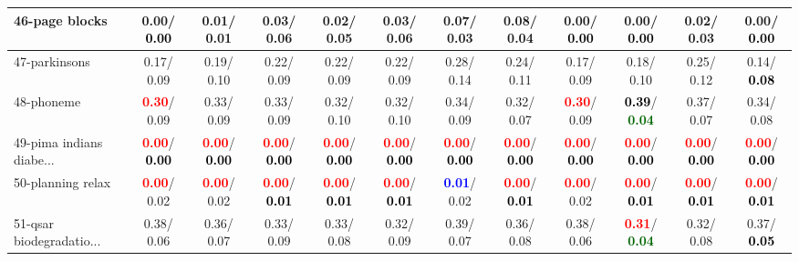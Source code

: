 \begin{table}[h]
\begin{center}
{\begin{tabular}{lc|c|c|c|c|c|c|c|c|c|c}
46-page blocks &   0.00/\textcolor{black}{\textbf{  0.00}} &   0.01/  0.01 &   0.03/  0.06 &   0.02/  0.05 &   0.03/  0.06 &   0.07/  0.03 &   0.08/  0.04 &   0.00/\textcolor{black}{\textbf{  0.00}} &   0.00/\textcolor{black}{\textbf{  0.00}} &   0.02/  0.03 &   0.00/\textcolor{black}{\textbf{  0.00}} \\ \hline
47-parkinsons &   0.17/  0.09 &   0.19/  0.10 &   0.22/  0.09 &   0.22/  0.09 &   0.22/  0.09 &   0.28/  0.14 &   0.24/  0.11 &   0.17/  0.09 &   0.18/  0.10 &   0.25/  0.12 &   0.14/\textcolor{black}{\textbf{  0.08}} \\
48-phoneme & \textcolor{red}{\textbf{  0.30}}/  0.09 &   0.33/  0.09 &   0.33/  0.09 &   0.32/  0.10 &   0.32/  0.10 &   0.34/  0.09 &   0.32/  0.07 & \textcolor{red}{\textbf{  0.30}}/  0.09 & \textcolor{black}{\textbf{  0.39}}/\textcolor{darkgreen}{\textbf{  0.04}} &   0.37/  0.07 &   0.34/  0.08 \\
49-pima indians diabe... & \textcolor{red}{\textbf{  0.00}}/\textcolor{black}{\textbf{  0.00}} & \textcolor{red}{\textbf{  0.00}}/\textcolor{black}{\textbf{  0.00}} & \textcolor{red}{\textbf{  0.00}}/\textcolor{black}{\textbf{  0.00}} & \textcolor{red}{\textbf{  0.00}}/\textcolor{black}{\textbf{  0.00}} & \textcolor{red}{\textbf{  0.00}}/\textcolor{black}{\textbf{  0.00}} & \textcolor{red}{\textbf{  0.00}}/\textcolor{black}{\textbf{  0.00}} & \textcolor{red}{\textbf{  0.00}}/\textcolor{black}{\textbf{  0.00}} & \textcolor{red}{\textbf{  0.00}}/\textcolor{black}{\textbf{  0.00}} & \textcolor{red}{\textbf{  0.00}}/\textcolor{black}{\textbf{  0.00}} & \textcolor{red}{\textbf{  0.00}}/\textcolor{black}{\textbf{  0.00}} & \textcolor{red}{\textbf{  0.00}}/\textcolor{black}{\textbf{  0.00}} \\
50-planning relax & \textcolor{red}{\textbf{  0.00}}/  0.02 & \textcolor{red}{\textbf{  0.00}}/  0.02 & \textcolor{red}{\textbf{  0.00}}/\textcolor{black}{\textbf{  0.01}} & \textcolor{red}{\textbf{  0.00}}/\textcolor{black}{\textbf{  0.01}} & \textcolor{red}{\textbf{  0.00}}/\textcolor{black}{\textbf{  0.01}} & \textcolor{blue}{\textbf{  0.01}}/  0.02 & \textcolor{red}{\textbf{  0.00}}/\textcolor{black}{\textbf{  0.01}} & \textcolor{red}{\textbf{  0.00}}/  0.02 & \textcolor{red}{\textbf{  0.00}}/\textcolor{black}{\textbf{  0.01}} & \textcolor{red}{\textbf{  0.00}}/\textcolor{black}{\textbf{  0.01}} & \textcolor{red}{\textbf{  0.00}}/\textcolor{black}{\textbf{  0.01}} \\
51-qsar biodegradatio... &   0.38/  0.06 &   0.36/  0.07 &   0.33/  0.09 &   0.33/  0.08 &   0.32/  0.09 &   0.39/  0.07 &   0.36/  0.08 &   0.38/  0.06 & \textcolor{red}{\textbf{  0.31}}/\textcolor{darkgreen}{\textbf{  0.04}} &   0.32/  0.08 &   0.37/\textcolor{black}{\textbf{  0.05}} \\

\end{tabular}}
\end{center}
\end{table}
